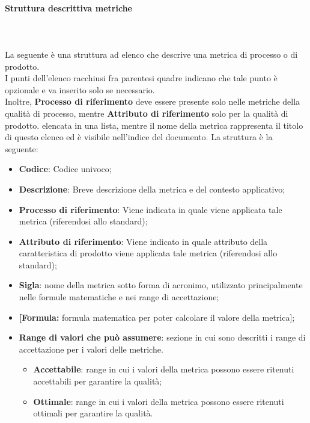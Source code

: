 \paragraph{Struttura descrittiva metriche}\mbox{}\\ \\
La seguente è una struttura ad elenco che descrive una metrica di processo o di prodotto. \\
I punti dell'elenco racchiusi fra parentesi quadre indicano che tale punto è opzionale e va inserito solo se necessario.\\
Inoltre, \textbf{Processo di riferimento} deve essere presente solo nelle metriche della qualità di processo, mentre \textbf{Attributo di riferimento} solo per la qualità di prodotto.
elencata in una lista, mentre il nome della metrica rappresenta il titolo di questo elenco ed è visibile nell'indice del documento. La struttura è la seguente:
\begin{itemize}
    \item \textbf{Codice}: Codice univoco;
    \item \textbf{Descrizione}: Breve descrizione della metrica e del contesto applicativo;
    \item \textbf{Processo di riferimento}: Viene indicata in quale  viene applicata tale metrica (riferendosi allo standard);
    \item \textbf{Attributo di riferimento}: Viene indicato in quale attributo della caratteristica di prodotto viene applicata tale metrica (riferendosi allo standard);
    \item \textbf{Sigla}: nome della metrica sotto forma di acronimo, utilizzato principalmente nelle formule matematiche e nei range di accettazione;
    \item \textbf{[Formula:} formula matematica per poter calcolare il valore della metrica];
    \item \textbf{Range di valori che può assumere}: sezione in cui sono descritti i range di accettazione per i valori delle metriche.
    \begin{itemize}
        \item \textbf{Accettabile}: range in cui i valori della metrica possono essere ritenuti accettabili per garantire la qualità;
        \item \textbf{Ottimale}: range in cui i valori della metrica possono essere ritenuti ottimali per garantire la qualità.
    \end{itemize}
\end{itemize}

